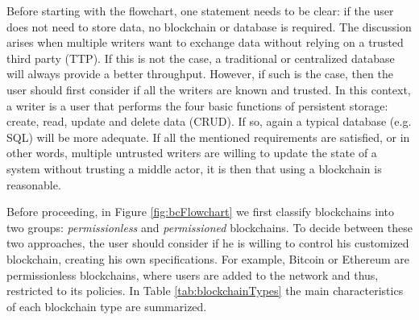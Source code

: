 Before starting with the flowchart, one statement needs to be clear: if the user does not need to store data, no blockchain or database is required. The discussion arises when multiple writers want to exchange data without relying on a trusted third party (TTP). If this is not the case, a traditional or centralized database will always provide a better throughput. However, if such is the case, then the user should first consider if all the writers are known and trusted. In this context, a writer is a user that performs the four basic functions of persistent storage: create, read, update and delete data (CRUD). If so, again a typical database (e.g. SQL) will be more adequate. If all the mentioned requirements are satisfied, or in other words, multiple untrusted writers are willing to update the state of a system without trusting a middle actor, it is then that using a blockchain is reasonable.

Before proceeding, in Figure \ref{fig:bcFlowchart} we first classify blockchains into two groups: \textit{permissionless} and \textit{permissioned} blockchains. To decide between these two approaches, the user should consider if he is willing to control his customized blockchain, creating his own specifications. For example, Bitcoin or Ethereum are permissionless blockchains, where users are added to the network and thus, restricted to its policies. In Table \ref{tab:blockchainTypes} the main characteristics of each blockchain type are summarized.

